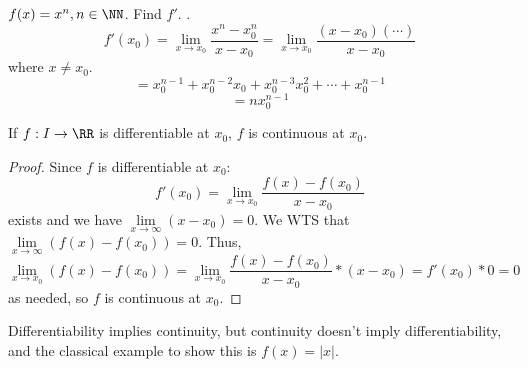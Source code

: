 \documentclass[12pt]{scrartcl}
\begin{document}
\begin{example}
  $f(x) = x^n, n \in \NN$. Find $f'$. .
  \[f'(x_0) = \lim_{x\to x_0}\frac{x^n - x_0^n}{x - x_0} = \lim_{x\to x_0}\frac{(x-x_0)(\cdots)}{x - x_0}\]
  where $x \neq x_0$. 
  \[= x_0^{n-1} + x_0^{n-2}x_0 + x_0^{n-3}x_0^2 + \cdots + x_0^{n-1}\]
  \[= n x_0^{n-1}\]
\end{example}

\begin{theorem}
  If $f: I \to \RR$ is differentiable at $x_0$, $f$ is continuous at $x_0$.

  \begin{proof}
    Since $f$ is differentiable at $x_0$: 
    \[f'(x_0) = \lim_{x\to x_0} \frac{f(x) - f(x_0)}{x - x_0}\]
    exists and we have $\underset{x\to\infty}{\lim}(x-x_0) = 0$. We WTS that $\underset{x\to\infty}{\lim}(f(x) - f(x_0)) = 0$. 
    Thus, \[\underset{x\to x_0}{\lim}{(f(x) -  f(x_0))} = \lim_{x\to x_0}\frac{f(x) - f(x_0)}{x-x_0} * (x-x_0) = f'(x_0) * 0 = 0\]
    as needed, so $f$ is continuous at $x_0$.
  \end{proof}
\end{theorem}

\begin{note}
  Differentiability implies continuity, but continuity doesn't imply differentiability, and the 
  classical example to show this is $f(x) = |x|$. 
\end{note}
\end{document}
